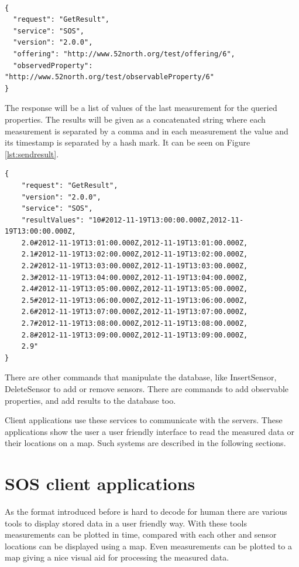 \begin{lstlisting}[caption={JSON minimal GetResult POST request\label{lst:getresult}}]

{
  "request": "GetResult",
  "service": "SOS",
  "version": "2.0.0",
  "offering": "http://www.52north.org/test/offering/6",
  "observedProperty": "http://www.52north.org/test/observableProperty/6"
}
\end{lstlisting}

The response will be a list of values of the last measurement for the queried properties. The results will be given as a concatenated string where each measurement is separated by a comma and in each measurement the value and its timestamp is separated by a hash mark. It can be seen on Figure \ref{lst:sendresult}.

\begin{lstlisting}[caption={JSON GetResult response\label{lst:sendresult}}]
{
    "request": "GetResult",
    "version": "2.0.0",
    "service": "SOS",
    "resultValues": "10#2012-11-19T13:00:00.000Z,2012-11-19T13:00:00.000Z,
    2.0#2012-11-19T13:01:00.000Z,2012-11-19T13:01:00.000Z,
    2.1#2012-11-19T13:02:00.000Z,2012-11-19T13:02:00.000Z,
    2.2#2012-11-19T13:03:00.000Z,2012-11-19T13:03:00.000Z,
    2.3#2012-11-19T13:04:00.000Z,2012-11-19T13:04:00.000Z,
    2.4#2012-11-19T13:05:00.000Z,2012-11-19T13:05:00.000Z,
    2.5#2012-11-19T13:06:00.000Z,2012-11-19T13:06:00.000Z,
    2.6#2012-11-19T13:07:00.000Z,2012-11-19T13:07:00.000Z,
    2.7#2012-11-19T13:08:00.000Z,2012-11-19T13:08:00.000Z,
    2.8#2012-11-19T13:09:00.000Z,2012-11-19T13:09:00.000Z,
    2.9"
}
\end{lstlisting}

There are other commands that manipulate the database, like InsertSensor, DeleteSensor to add or remove sensors. There are commands to add observable properties, and add results to the database too. 

Client applications use these services to communicate with the servers. These applications show the user a user friendly interface to read the measured data or their locations on a map. Such systems are described in the following sections.

\section{SOS client applications}

As the format introduced before is hard to decode for human there are various tools to display stored data in a user friendly way. With these tools measurements can be plotted in time, compared with each other and sensor locations can be displayed using a map. Even measurements can be plotted to a map giving a nice visual aid for processing the measured data. 

